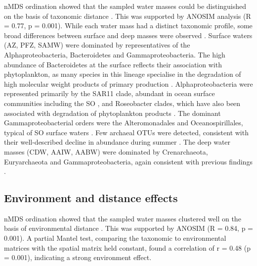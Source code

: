 \ac{nMDS} ordination showed that the sampled water masses could be distinguished on the basis of taxonomic distance .
This was supported by \ac{ANOSIM} analysis (R = 0.77, p = 0.001).
While each water mass had a distinct taxonomic profile, some broad differences between surface and deep masses were observed .
Surface waters (\ac{AZ}, \ac{PFZ}, \ac{SAMW}) were dominated by representatives of the Alphaproteobacteria, Bacteroidetes and Gammaproteobacteria.
The high abundance of Bacteroidetes at the surface reflects their association with phytoplankton, as many species in this lineage specialise in the degradation of high molecular weight products of primary production \cite{Williams:2012gsa}.
Alphaproteobacteria were represented primarily by the SAR11 clade, abundant in ocean surface communities \cite{Morris:2002bn} including the \ac{SO} \cite{Brown:2012gna}, and Roseobacter clades, which have also been associated with degradation of phytoplankton products \cite{Williams:2012gsa, Giebel:2009hr}.
The dominant Gammaproteobacterial orders were the Alteromonadales and Oceanospirillales, typical of \ac{SO} surface waters \cite{Wilkins:2012ii}.
Few archaeal \acp{OTU} were detected, consistent with their well-described decline in abundance during summer \cite{Murray:1998wy, Grzymski:2012ej}.
The deep water masses (\ac{CDW}, \ac{AAIW}, \ac{AABW}) were dominated by Crenarchaeota, Euryarchaeota and Gammaproteobacteria, again consistent with previous findings \cite{LopezGarcia:2001vp}.



\subsection{Environment and distance effects}
\ac{nMDS} ordination showed that the sampled water masses clustered well on the basis of environmental distance .
This was supported by \ac{ANOSIM} (R = 0.84, p = 0.001). 
A partial Mantel test, comparing the taxonomic to environmental matrices with the spatial matrix held constant, found a correlation of r = 0.48 (p = 0.001), indicating a strong environment effect.




